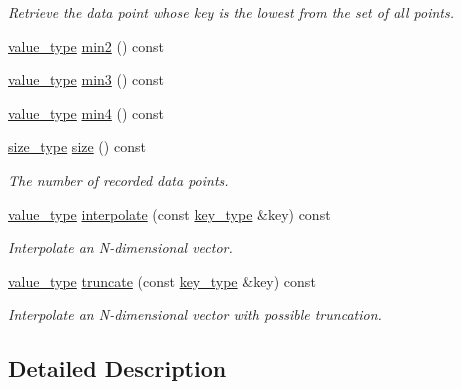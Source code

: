 \begin{DoxyCompactItemize}
\begin{DoxyCompactList}\small\item\em \-Retrieve the data point whose key is the lowest from the set of all points. \end{DoxyCompactList}\item 
\hyperlink{classmetrobotics_1_1Lerp_ab1be5a6a96856f10c5eadc416d630a40}{value\-\_\-type} \hyperlink{classmetrobotics_1_1Lerp_a7cca3c54fb7c62a4cd16462701b4e63c}{min2} () const 
\item 
\hyperlink{classmetrobotics_1_1Lerp_ab1be5a6a96856f10c5eadc416d630a40}{value\-\_\-type} \hyperlink{classmetrobotics_1_1Lerp_a7c8f74d5d5bed6dee3049713d153dda1}{min3} () const 
\item 
\hyperlink{classmetrobotics_1_1Lerp_ab1be5a6a96856f10c5eadc416d630a40}{value\-\_\-type} \hyperlink{classmetrobotics_1_1Lerp_a577afc6af638b199fab19fd5e01eaf10}{min4} () const 
\item 
\hyperlink{classmetrobotics_1_1Lerp_a10263c93dd1cabed5b5c06585f13c272}{size\-\_\-type} \hyperlink{classmetrobotics_1_1Lerp_adca8a45e6771cb87b6db6146ac1d6a1c}{size} () const 
\begin{DoxyCompactList}\small\item\em \-The number of recorded data points. \end{DoxyCompactList}\item 
\hyperlink{classmetrobotics_1_1Lerp_ab1be5a6a96856f10c5eadc416d630a40}{value\-\_\-type} \hyperlink{classmetrobotics_1_1Lerp_ae99b7e367d931570c78b87816bfb6a83}{interpolate} (const \hyperlink{classmetrobotics_1_1Lerp_a3cd6f9215623083b5ed90f4c03ac6dc7}{key\-\_\-type} \&key) const 
\begin{DoxyCompactList}\small\item\em \-Interpolate an \-N-\/dimensional vector. \end{DoxyCompactList}\item 
\hyperlink{classmetrobotics_1_1Lerp_ab1be5a6a96856f10c5eadc416d630a40}{value\-\_\-type} \hyperlink{classmetrobotics_1_1Lerp_afff98461546c80fcb3fe0e3880a45a41}{truncate} (const \hyperlink{classmetrobotics_1_1Lerp_a3cd6f9215623083b5ed90f4c03ac6dc7}{key\-\_\-type} \&key) const 
\begin{DoxyCompactList}\small\item\em \-Interpolate an \-N-\/dimensional vector with possible truncation. \end{DoxyCompactList}\end{DoxyCompactItemize}


\subsection{\-Detailed \-Description}

